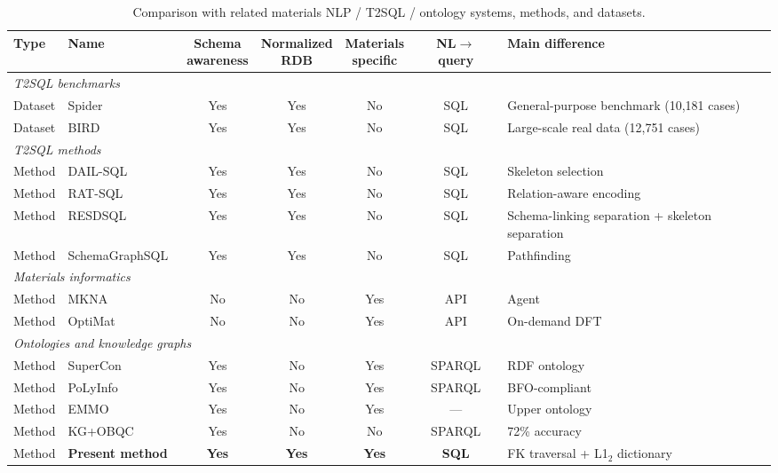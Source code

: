 \documentclass[5p,twocolumn]{elsarticle}
\begin{document}
\begin{table}[htbp]
  \centering
  \caption{Comparison with related materials NLP / T2SQL / ontology systems, methods, and datasets.}
  \label{tab:related_comparison}
  \small
  \begin{tabularx}{\textwidth}{llccccX}
    \toprule
    Type & Name & \shortstack{Schema\\awareness} & \shortstack{Normalized\\RDB} & \shortstack{Materials\\specific} & \shortstack{NL$\to$\\query} & Main difference \\
    \midrule
    \multicolumn{7}{l}{\textit{T2SQL benchmarks}} \\
    Dataset & Spider~\citep{yu2018spider} & Yes & Yes & No & SQL & General-purpose benchmark (10{,}181 cases) \\
    Dataset & BIRD~\citep{li2024bird} & Yes & Yes & No & SQL & Large-scale real data (12{,}751 cases) \\
    \midrule
    \multicolumn{7}{l}{\textit{T2SQL methods}} \\
    Method & DAIL-SQL~\citep{gao2023dail} & Yes & Yes & No & SQL & Skeleton selection \\
    Method & RAT-SQL~\citep{wang2020ratsql} & Yes & Yes & No & SQL & Relation-aware encoding \\
    Method & RESDSQL~\citep{li2023resdsql} & Yes & Yes & No & SQL & Schema-linking separation + skeleton separation \\
    Method & SchemaGraphSQL~\citep{safdarian2026schemagraphsql} & Yes & Yes & No & SQL & Pathfinding \\
    \midrule
    \multicolumn{7}{l}{\textit{Materials informatics}} \\
    Method & MKNA~\citep{zhuang2026mkna} & No & No & Yes & API & Agent \\
    Method & OptiMat~\citep{hu2026optimat} & No & No & Yes & API & On-demand DFT \\
    \midrule
    \multicolumn{7}{l}{\textit{Ontologies and knowledge graphs}} \\
    Method & SuperCon~\citep{ishii2023supercon} & Yes & No & Yes & SPARQL & RDF ontology \\
    Method & PoLyInfo~\citep{ishii2024polyinfo} & Yes & No & Yes & SPARQL & BFO-compliant \\
    Method & EMMO~\citep{emmo2020} & Yes & No & Yes & --- & Upper ontology \\
    Method & KG+OBQC~\citep{allemang2024obqc} & Yes & No & No & SPARQL & 72\% accuracy \\
    \midrule
    Method & \textbf{Present method} & \textbf{Yes} & \textbf{Yes} & \textbf{Yes} & \textbf{SQL} & FK traversal + L1$_2$ dictionary \\
    \bottomrule
  \end{tabularx}
\end{table}
\end{document}
